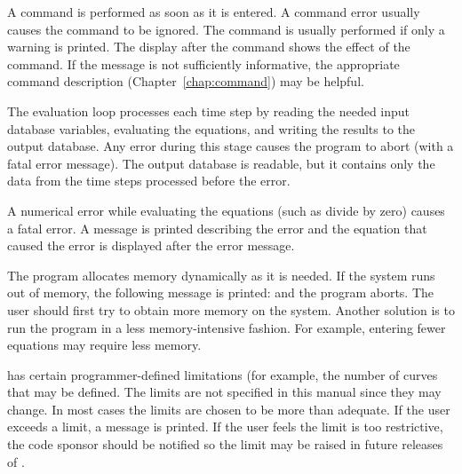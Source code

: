 A command is performed as soon as it is entered. A command error usually
causes the command to be ignored. The command is usually performed if
only a warning is printed. The display after the command shows the
effect of the command. If the message is not sufficiently informative,
the appropriate command description (Chapter~\ref{chap:command}) may be
helpful.

The evaluation loop processes each time step by reading the needed input
database variables, evaluating the equations, and writing the results to
the output database. Any error during this stage causes the program to
abort (with a fatal error message). The output database is readable, but
it contains only the data from the time steps processed before the
error.

A numerical error while evaluating the equations (such as divide by
zero) causes a fatal error. A message is printed describing the error
and the equation that caused the error is displayed after the error
message.

The program allocates memory dynamically as it is needed. If the system
runs out of memory, the following message is printed:
and the program aborts. The user should first try to obtain more memory
on the system. Another solution is to run the program in a less
memory-intensive fashion. For example, entering fewer equations may
require less memory.

\caps{\PROGRAM} has certain programmer-defined limitations (for example,
the number of curves that may be defined. The limits are not specified
in this manual since they may change. In most cases the limits are
chosen to be more than adequate. If the user exceeds a limit, a message
is printed. If the user feels the limit is too restrictive, the code
sponsor should be notified so the limit may be raised in future releases
of \caps{\PROGRAM}.
